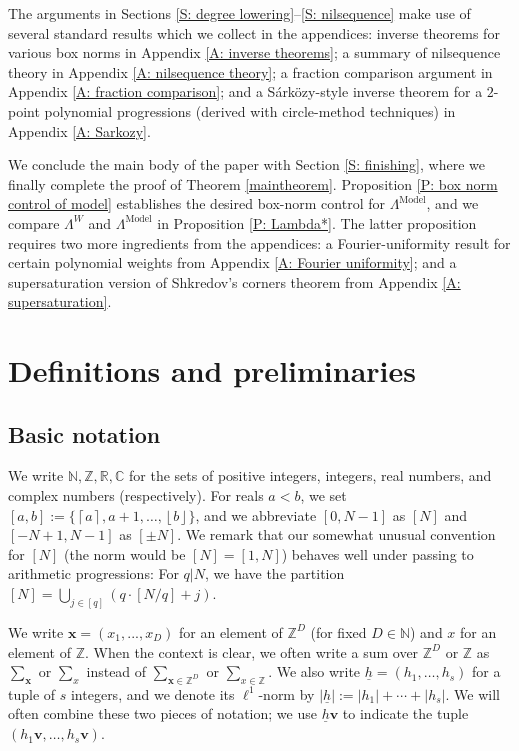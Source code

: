 \documentclass[11pt]{amsart}
\theoremstyle{definition}
\newcommand{\C}{{\mathbb C}}
\newcommand{\N}{{\mathbb N}}
\newcommand{\R}{{\mathbb R}}
\newcommand{\Z}{{\mathbb Z}}
\newcommand{\bv}{{\textbf{v}}}
\newcommand{\x}{{\textbf{x}}}
\newcommand{\bx}{{\textbf{x}}}
\newcommand{\uh}{{\underline{h}}}
\newcommand{\model}{{\mathrm{Model}}}
\newcommand{\floor}[1]{\left \lfloor #1 \right \rfloor}
\newcommand{\ceil}[1]{\left \lceil #1 \right \rceil}
\begin{document}
The arguments in Sections \ref{S: degree lowering}--\ref{S: nilsequence} make use of several standard results which we collect in the appendices: inverse theorems for various box norms  in Appendix \ref{A: inverse theorems}; a summary of nilsequence theory in Appendix \ref{A: nilsequence theory}; a fraction comparison argument in Appendix \ref{A: fraction comparison}; and a S\'ark\"ozy-style inverse theorem for a $2$-point polynomial progressions (derived with circle-method techniques)  in Appendix \ref{A: Sarkozy}.

We conclude the main body of the paper with Section \ref{S: finishing}, where we finally complete the proof of Theorem \ref{maintheorem}.   Proposition \ref{P: box norm control of model} establishes the desired box-norm control for $\Lambda^\model$, and we compare $\Lambda^W$ and $\Lambda^\model$ in Proposition \ref{P: Lambda*}. The latter proposition requires two more ingredients from the appendices: a Fourier-uniformity result for certain polynomial weights from Appendix \ref{A: Fourier uniformity}; and a supersaturation version of Shkredov's corners theorem from Appendix \ref{A: supersaturation}.






\section{Definitions and preliminaries}\label{S: definitions}


\subsection{Basic notation} 
We write $\N,\Z, \R, \C$ for the sets of positive integers, integers, real numbers, and complex numbers (respectively). For reals $a<b$, we set $[a,b]:= \{\ceil{a}, a+1, \ldots, \floor{b}\}$, and we abbreviate $[0,N-1]$ as $[N]$ and $[-N+1,N-1]$ as $[\pm N]$.  We remark that our somewhat unusual convention for $[N]$ (the norm would be $[N]=[1,N]$) behaves well under passing to arithmetic progressions: For $q|N$, we have the partition $[N] = \bigcup_{j\in[q]}(q\cdot[N/q]+j)$.

We write $\x = (x_1, ..., x_D)$ for an element of $\Z^D$ (for fixed $D\in\N$) and $x$ for an element of $\Z$. When the context is clear, we often write a sum over $\Z^D$ or $\Z$ as $\sum_{\bx}$ or $\sum_x$ instead of $\sum_{\bx \in \Z^D}$ or $\sum_{x \in \Z}$. We also write $\uh=(h_1, \ldots, h_s)$ for a tuple of $s$ integers, and we denote its $\ell^1$-norm by $|\uh|:=|h_1|+\cdots + |h_s|$. We will often combine these two pieces of notation; we use $\uh \bv$ to indicate the tuple $(h_1 \bv, \ldots, h_s\bv)$. 
\end{document}
